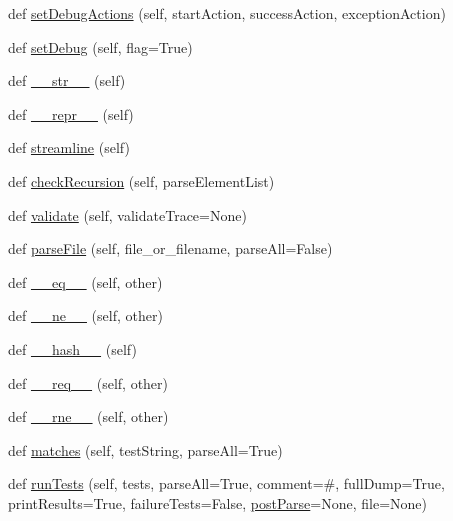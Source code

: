 \begin{DoxyCompactItemize}
def \hyperlink{classpyparsing_1_1ParserElement_a75debf95f36a4f456b6760a315587c50}{set\+Debug\+Actions} (self, start\+Action, success\+Action, exception\+Action)
\item 
def \hyperlink{classpyparsing_1_1ParserElement_ac5d0f98e4a43fd89567d218b36229eae}{set\+Debug} (self, flag=True)
\item 
def \hyperlink{classpyparsing_1_1ParserElement_a72ae436ae72b12a0e03572f62f5a35ae}{\+\_\+\+\_\+str\+\_\+\+\_\+} (self)
\item 
def \hyperlink{classpyparsing_1_1ParserElement_a299291d78f90aae57bb292bba93f41cf}{\+\_\+\+\_\+repr\+\_\+\+\_\+} (self)
\item 
def \hyperlink{classpyparsing_1_1ParserElement_a09856e9ee0198b9e5da936e4f401f2f2}{streamline} (self)
\item 
def \hyperlink{classpyparsing_1_1ParserElement_a46cfe4be87dff6cb52586a0b4ead2b79}{check\+Recursion} (self, parse\+Element\+List)
\item 
def \hyperlink{classpyparsing_1_1ParserElement_ab3aa74c2cd7880b45b594e8cfea22a07}{validate} (self, validate\+Trace=None)
\item 
def \hyperlink{classpyparsing_1_1ParserElement_a5076b859e68470bd5fbe3f993be3e187}{parse\+File} (self, file\+\_\+or\+\_\+filename, parse\+All=False)
\item 
def \hyperlink{classpyparsing_1_1ParserElement_adff8e67070c5b194296539a11fa5c322}{\+\_\+\+\_\+eq\+\_\+\+\_\+} (self, other)
\item 
def \hyperlink{classpyparsing_1_1ParserElement_a3ac9c1ebf1401b4aed12a88eafd18194}{\+\_\+\+\_\+ne\+\_\+\+\_\+} (self, other)
\item 
def \hyperlink{classpyparsing_1_1ParserElement_aa43665da30f0da5e64586cad142162e7}{\+\_\+\+\_\+hash\+\_\+\+\_\+} (self)
\item 
def \hyperlink{classpyparsing_1_1ParserElement_a268f1bf51db4445eb7821d8ce259bc4b}{\+\_\+\+\_\+req\+\_\+\+\_\+} (self, other)
\item 
def \hyperlink{classpyparsing_1_1ParserElement_a5d076104f4ede59b1f6d6d56c568612b}{\+\_\+\+\_\+rne\+\_\+\+\_\+} (self, other)
\item 
def \hyperlink{classpyparsing_1_1ParserElement_a74c460f23d82ac8aff6b6afb6003bf3e}{matches} (self, test\+String, parse\+All=True)
\item 
def \hyperlink{classpyparsing_1_1ParserElement_ac0985c9cc1956ae149461e308f69afa4}{run\+Tests} (self, tests, parse\+All=True, comment=\textquotesingle{}\#\textquotesingle{}, full\+Dump=True, print\+Results=True, failure\+Tests=False, \hyperlink{classpyparsing_1_1ParserElement_a3b6548ce7bb9df91108b4f923c25137c}{post\+Parse}=None, file=None)
\end{DoxyCompactItemize}

